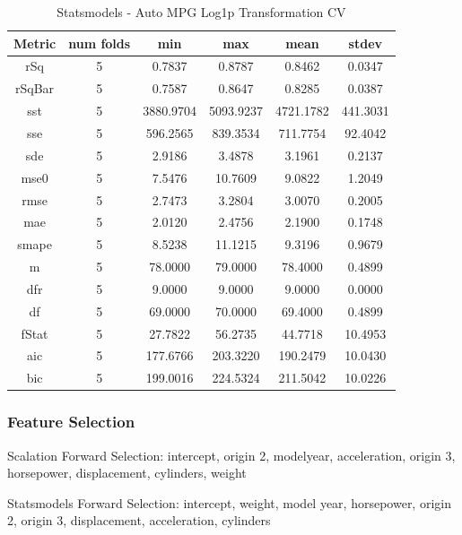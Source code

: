 \documentclass{article}
\begin{document}
\begin{table}[H]
\centering
\caption{Statsmodels - Auto MPG Log1p Transformation CV}
\label{tab:Statsmodels - Auto MPG Log1p Transformation CV}
\begin{tabular}{|c|c|c|c|c|c|}\hline
Metric & num folds & min & max & mean & stdev \\ \hline \hline
rSq & 5 & 0.7837 & 0.8787 & 0.8462 & 0.0347 \\ \hline
rSqBar & 5 & 0.7587 & 0.8647 & 0.8285 & 0.0387 \\ \hline
sst & 5 & 3880.9704 & 5093.9237 & 4721.1782 & 441.3031 \\ \hline
sse & 5 & 596.2565 & 839.3534 & 711.7754 & 92.4042 \\ \hline
sde & 5 & 2.9186 & 3.4878 & 3.1961 & 0.2137 \\ \hline
mse0 & 5 & 7.5476 & 10.7609 & 9.0822 & 1.2049 \\ \hline
rmse & 5 & 2.7473 & 3.2804 & 3.0070 & 0.2005 \\ \hline
mae & 5 & 2.0120 & 2.4756 & 2.1900 & 0.1748 \\ \hline
smape & 5 & 8.5238 & 11.1215 & 9.3196 & 0.9679 \\ \hline
m & 5 & 78.0000 & 79.0000 & 78.4000 & 0.4899 \\ \hline
dfr & 5 & 9.0000 & 9.0000 & 9.0000 & 0.0000 \\ \hline
df & 5 & 69.0000 & 70.0000 & 69.4000 & 0.4899 \\ \hline
fStat & 5 & 27.7822 & 56.2735 & 44.7718 & 10.4953 \\ \hline
aic & 5 & 177.6766 & 203.3220 & 190.2479 & 10.0430 \\ \hline
bic & 5 & 199.0016 & 224.5324 & 211.5042 & 10.0226 \\ \hline
\end{tabular}
\end{table}

\subsubsection{Feature Selection}

Scalation Forward Selection: intercept, origin 2, modelyear, acceleration, origin 3, horsepower, displacement, cylinders, weight

Statsmodels Forward Selection: intercept, weight, model year, horsepower, origin 2, origin 3, displacement, acceleration, cylinders
\end{document}
